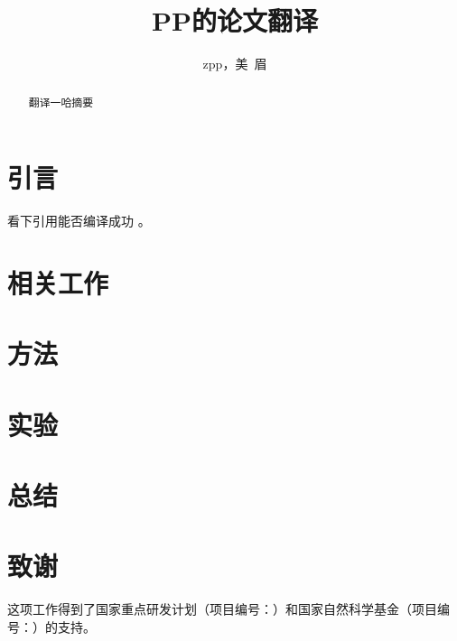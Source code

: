 \documentclass[10pt,journal,compsoc]{IEEEtran}
\begin{document}
	
\title{PP的论文翻译}

\author{zpp，美~眉}

\maketitle

\begin{abstract}
\label{sec:abstract}
翻译一哈摘要
\end{abstract}




\IEEEpeerreviewmaketitle



\section{引言}
\label{sec:into}
看下引用能否编译成功 \cite{test2020}。

\section{相关工作}
\label{sec:related}


\section{方法}
\label{sec:method}

\section{实验}
\label{sec:experiment}


\section{总结}
\label{sec:conclusion}



\section*{致谢}
这项工作得到了国家重点研发计划（项目编号：）和国家自然科学基金（项目编号：）的支持。



\end{document}
